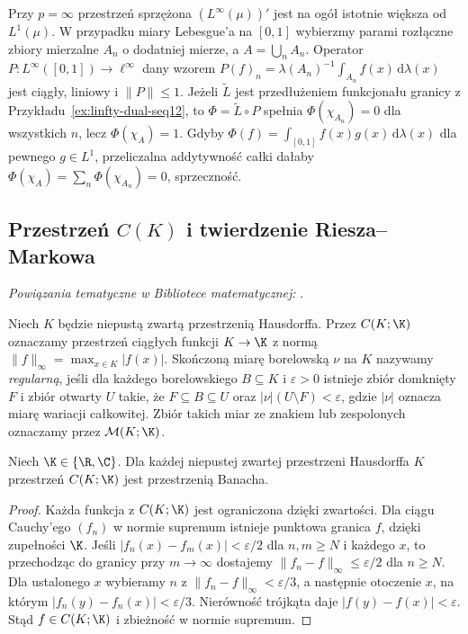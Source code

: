 \begin{uwaga}
\label{rem:linfty-dual12}
Przy $p=\infty$ przestrzeń sprzężona $(L^\infty(\mu))'$ jest
na ogół istotnie większa od $L^1(\mu)$. W przypadku miary
Lebesgue'a na $[0,1]$ wybierzmy parami rozłączne zbiory mierzalne
$A_n$ o dodatniej mierze, a $A=\bigcup_nA_n$. Operator
$P:L^\infty([0,1])\to\ell^\infty$ dany wzorem
$P(f)_n=\lambda(A_n)^{-1}\int_{A_n}f(x)\,\mathrm d\lambda(x)$
jest ciągły, liniowy i $\|P\|\le1$.
Jeżeli $\widetilde L$ jest przedłużeniem funkcjonału granicy
z Przykładu~\ref{ex:linfty-dual-seq12}, to $\Phi=\widetilde L\circ P$
spełnia $\Phi(\chi_{A_n})=0$ dla wszystkich $n$, lecz
$\Phi(\chi_A)=1$.
Gdyby $\Phi(f)=\int_{[0,1]}f(x)g(x)\,\mathrm d\lambda(x)$
dla pewnego $g\in L^1$, przeliczalna addytywność całki dałaby
$\Phi(\chi_A)=\sum_n\Phi(\chi_{A_n})=0$, sprzeczność.
\end{uwaga}

\subsection{Przestrzeń \texorpdfstring{$C(K)$}{C(K)} i twierdzenie Riesza--Markowa}

\noindent\emph{Powiązania tematyczne w Bibliotece matematycznej:} .


\begin{definicja}
\label{def:ck-measures12}
Niech $K$ będzie niepustą zwartą przestrzenią Hausdorffa.
Przez $C(K;\K)$ oznaczamy przestrzeń ciągłych funkcji
$K\to\K$ z normą $\|f\|_\infty=\max_{x\in K}|f(x)|$.
Skończoną miarę borelowską $\nu$ na $K$ nazywamy
\emph{regularną}, jeśli dla każdego borelowskiego $B\subseteq K$
i $\varepsilon>0$ istnieje zbiór domknięty $F$ i zbiór otwarty
$U$ takie, że $F\subseteq B\subseteq U$ oraz
$|\nu|(U\setminus F)<\varepsilon$, gdzie $|\nu|$ oznacza
miarę wariacji całkowitej. Zbiór takich miar ze znakiem
lub zespolonych oznaczamy przez $\mathcal M(K;\K)$.
\end{definicja}

\begin{stwierdzenie}[Zupełność $C(K)$]
\label{prop:ck-banach12}
Niech $\K\in\{\R,\C\}$. Dla każdej niepustej zwartej przestrzeni Hausdorffa $K$
przestrzeń $C(K;\K)$ jest przestrzenią Banacha.
\end{stwierdzenie}
\begin{proof}
Każda funkcja z $C(K;\K)$ jest ograniczona dzięki zwartości. Dla ciągu Cauchy'ego $(f_n)$ w normie supremum istnieje punktowa granica $f$, dzięki zupełności $\K$. Jeśli $|f_n(x)-f_m(x)|<\varepsilon/2$ dla $n,m\ge N$ i każdego $x$, to przechodząc do granicy przy $m\to\infty$ dostajemy $\|f_n-f\|_\infty\le\varepsilon/2$ dla $n\ge N$. Dla ustalonego $x$ wybieramy $n$ z $\|f_n-f\|_\infty<\varepsilon/3$, a następnie otoczenie $x$, na którym $|f_n(y)-f_n(x)|<\varepsilon/3$. Nierówność trójkąta daje $|f(y)-f(x)|<\varepsilon$. Stąd $f\in C(K;\K)$ i zbieżność w normie supremum.
\end{proof}

